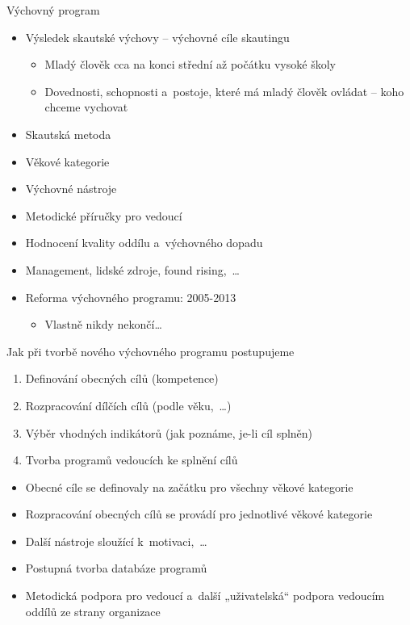 \documentclass[compress,xelatex,xcolor=dvipsnames,print]{beamer}
\begin{document}
\begin{frame}{Výchovný program}
\begin{itemize}
\item Výsledek skautské výchovy -- výchovné cíle skautingu
 \begin{itemize}
 \item Mladý člověk cca na konci střední až počátku vysoké školy
 \item Dovednosti, schopnosti a~postoje, které má mladý člověk ovládat -- koho chceme vychovat
 \end{itemize}
\item Skautská metoda
\item Věkové kategorie
\item Výchovné nástroje
\item Metodické příručky pro vedoucí
\item Hodnocení kvality oddílu a~výchovného dopadu
\item Management, lidské zdroje, found rising,~\ldots
\item Reforma výchovného programu: 2005-2013
\begin{itemize}
 \item Vlastně nikdy nekončí\ldots
\end{itemize}

\end{itemize}
\end{frame}

\begin{frame}{Jak při tvorbě nového výchovného programu postupujeme}
\begin{enumerate}
\item Definování obecných cílů (kompetence)
\item Rozpracování dílčích cílů (podle věku,~\ldots)
\item Výběr vhodných indikátorů (jak poznáme, je-li cíl splněn)
\item Tvorba programů vedoucích ke splnění cílů
\end{enumerate}
\begin{itemize}
\item Obecné cíle se definovaly na začátku pro všechny věkové kategorie
\item Rozpracování obecných cílů se provádí pro jednotlivé věkové kategorie
\item Další nástroje sloužící k~motivaci,~\ldots
\item Postupná tvorba databáze programů
\item Metodická podpora pro vedoucí a~další „uživatelská“ podpora vedoucím oddílů ze strany organizace
\end{itemize}
\end{frame}
\end{document}
